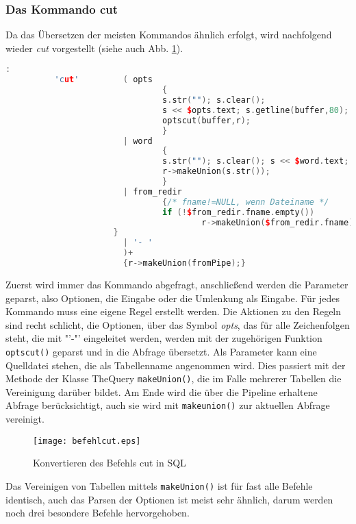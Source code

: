 \subsubsection{Das Kommando cut}
Da das Übersetzen der meisten Kommandos ähnlich erfolgt, wird nachfolgend wieder \textit{cut} vorgestellt (siehe auch Abb. \ref{fig:cut}).
\begin{lstlisting}[language=C++]
        :
          'cut'         ( opts
                                {
                                s.str(""); s.clear();
                                s << $opts.text; s.getline(buffer,80);
                                optscut(buffer,r);
                                }
                        | word
                                {
                                s.str(""); s.clear(); s << $word.text;
                                r->makeUnion(s.str());
                                }
                        | from_redir
                                {/* fname!=NULL, wenn Dateiname */
                                if (!$from_redir.fname.empty())
                                        r->makeUnion($from_redir.fname);
			          }
                        | '- '
                        )+
                        {r->makeUnion(fromPipe);}
\end{lstlisting}

Zuerst wird immer das Kommando abgefragt, anschließend werden die Parameter geparst, also Optionen, die Eingabe oder die Umlenkung als Eingabe. Für jedes Kommando muss eine eigene Regel erstellt werden. Die Aktionen zu den Regeln sind recht schlicht, die Optionen, über das Symbol \textit{opts}, das für alle Zeichenfolgen steht, die mit "'-"' eingeleitet werden, werden mit der zugehörigen Funktion \lstinline{optscut()} geparst und in die Abfrage übersetzt.
Als Parameter kann eine Quelldatei stehen, die als Tabellenname angenommen wird. Dies passiert mit der Methode der Klasse TheQuery \lstinline{makeUnion()}, die im Falle mehrerer Tabellen die Vereinigung darüber bildet.
Am Ende wird die über die Pipeline erhaltene Abfrage berücksichtigt, auch sie wird mit \lstinline{makeunion()} zur aktuellen Abfrage vereinigt.

\begin{figure}
\centering
\texttt{[image: befehlcut.eps]}
\caption{Konvertieren des Befehls cut in SQL}
\label{fig:cut}
\end{figure}

Das Vereinigen von Tabellen mittels \lstinline{makeUnion()} ist für fast alle Befehle identisch, auch das Parsen der Optionen ist meist sehr ähnlich, darum werden noch drei besondere Befehle hervorgehoben.


